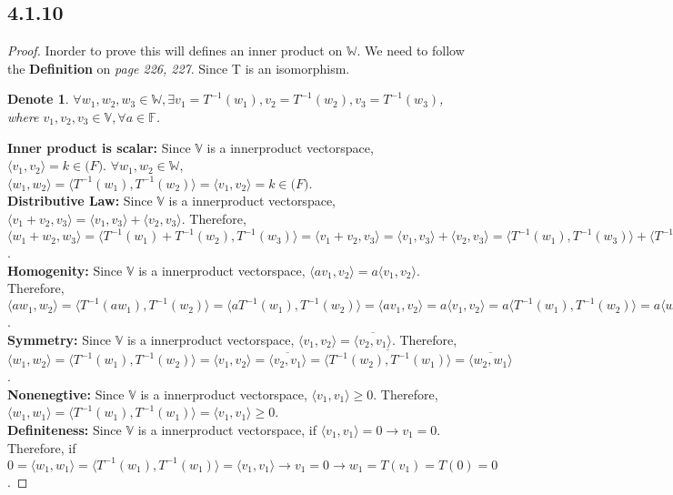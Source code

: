 \documentclass{article}
\newtheorem*{denote}{Denote}
\newtheorem*{proof}{Proof}
\begin{document}
\subsection*{4.1.10}
\begin{proof}
Inorder to prove this will defines an inner product on $\mathbb{W}$. We need to follow the \textbf{Definition} on \textit{page 226, 227}. Since T is an isomorphism.
\begin{denote}
    $\forall w_1, w_2, w_3 \in \mathbb{W}, \exists v_1 = T^{-1}(w_1), v_2 = T^{-1}(w_2), v_3 = T^{-1}(w_3)$, where $v_1, v_2, v_3 \in \mathbb{V}, \forall a \in \mathbb{F}$.
\end{denote}
\textbf{Inner product is scalar:} Since $\mathbb{V}$ is a innerproduct vectorspace, $\langle v_1, v_2 \rangle = k \in \mathbb(F)$.
$\forall w_1, w_2 \in \mathbb{W}$, $\langle w_1, w_2 \rangle = \langle T^{-1}(w_1), T^{-1}(w_2) \rangle = \langle v_1, v_2 \rangle = k \in \mathbb(F)$. \\
\textbf{Distributive Law:} Since $\mathbb{V}$ is a innerproduct vectorspace, $\langle v_1+v_2, v_3 \rangle = \langle v_1, v_3 \rangle + \langle v_2, v_3 \rangle$. Therefore,
$\langle w_1+w_2, w_3 \rangle = \langle T^{-1}(w_1) + T^{-1}(w_2), T^{-1}(w_3) \rangle = \langle v_1+v_2, v_3 \rangle = \langle v_1, v_3 \rangle + \langle v_2, v_3 \rangle
= \langle T^{-1}(w_1), T^{-1}(w_3) \rangle + \langle T^{-1}(w_2), T^{-1}(w_3) \rangle = \langle w_1, w_3 \rangle + \langle w_2, w_3 \rangle$. \\
\textbf{Homogenity:} Since $\mathbb{V}$ is a innerproduct vectorspace, $\langle av_1, v_2 \rangle = a\langle v_1, v_2 \rangle$. Therefore,
$\langle aw_1, w_2 \rangle = \langle T^{-1}(aw_1), T^{-1}(w_2) \rangle = \langle aT^{-1}(w_1), T^{-1}(w_2) \rangle = \langle av_1, v_2 \rangle = a\langle v_1, v_2 \rangle =
a\langle T^{-1}(w_1), T^{-1}(w_2) \rangle = a\langle w_1, w_2 \rangle$. \\
\textbf{Symmetry:} Since $\mathbb{V}$ is a innerproduct vectorspace, $\langle v_1, v_2 \rangle = \overline {\langle v_2, v_1 \rangle}$. Therefore,
$\langle w_1, w_2 \rangle = \langle T^{-1}(w_1), T^{-1}(w_2) \rangle = \langle v_1, v_2 \rangle = \overline {\langle v_2, v_1 \rangle}
= \overline {\langle T^{-1}(w_2), T^{-1}(w_1) \rangle} = \overline {\langle w_2, w_1 \rangle}$. \\
\textbf{Nonenegtive:} Since $\mathbb{V}$ is a innerproduct vectorspace, $\langle v_1, v_1 \rangle \ge 0$. Therefore, 
$\langle w_1, w_1 \rangle = \langle T^{-1}(w_1), T^{-1}(w_1) \rangle = \langle v_1, v_1 \rangle \ge 0$. \\
\textbf{Definiteness:} Since $\mathbb{V}$ is a innerproduct vectorspace, if $\langle v_1, v_1\rangle = 0 \rightarrow v_1 = 0$. Therefore,
if $0 = \langle w_1, w_1 \rangle = \langle T^{-1}(w_1), T^{-1}(w_1) \rangle = \langle v_1, v_1 \rangle \rightarrow v_1 = 0 \rightarrow w_1 = T(v_1) = T(0) = 0$.
\end{proof}
\end{document}
